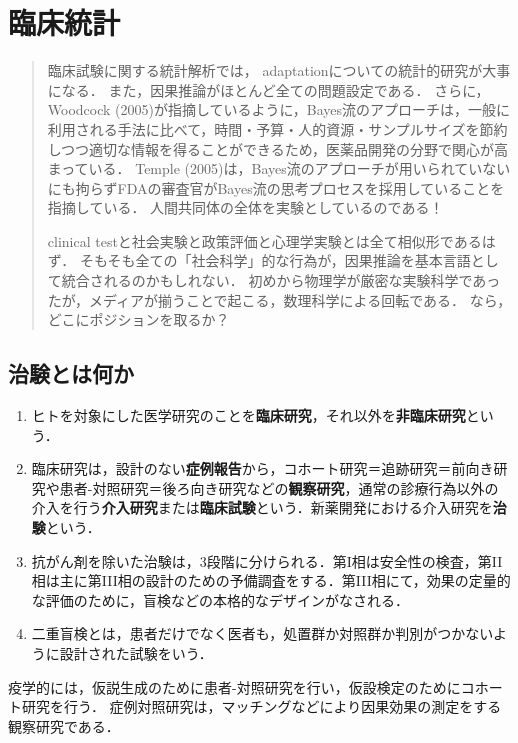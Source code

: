 \documentclass[uplatex,dvipdfmx]{jsreport}
\begin{document}
\chapter{臨床統計}

\begin{quotation}
    臨床試験に関する統計解析では，
    adaptationについての統計的研究が大事になる．
    また，因果推論がほとんど全ての問題設定である．
    さらに，Woodcock (2005)が指摘しているように，Bayes流のアプローチは，一般に利用される手法に比べて，時間・予算・人的資源・サンプルサイズを節約しつつ適切な情報を得ることができるため，医薬品開発の分野で関心が高まっている．
    Temple (2005)は，Bayes流のアプローチが用いられていないにも拘らずFDAの審査官がBayes流の思考プロセスを採用していることを指摘している．
    人間共同体の全体を実験としているのである！

    clinical testと社会実験と政策評価と心理学実験とは全て相似形であるはず．
    そもそも全ての「社会科学」的な行為が，因果推論を基本言語として統合されるのかもしれない．
    初めから物理学が厳密な実験科学であったが，メディアが揃うことで起こる，数理科学による回転である．
    なら，どこにポジションを取るか？
\end{quotation}

\section{治験とは何か}

\begin{definition}\mbox{}
    \begin{enumerate}
        \item ヒトを対象にした医学研究のことを\textbf{臨床研究}，それ以外を\textbf{非臨床研究}という．
        \item 臨床研究は，設計のない\textbf{症例報告}から，コホート研究＝追跡研究＝前向き研究や患者-対照研究＝後ろ向き研究などの\textbf{観察研究}，通常の診療行為以外の介入を行う\textbf{介入研究}または\textbf{臨床試験}という．新薬開発における介入研究を\textbf{治験}という．
        \item 抗がん剤を除いた治験は，3段階に分けられる．第I相は安全性の検査，第II相は主に第III相の設計のための予備調査をする．第III相にて，効果の定量的な評価のために，盲検などの本格的なデザインがなされる．
        \item 二重盲検とは，患者だけでなく医者も，処置群か対照群か判別がつかないように設計された試験をいう．
    \end{enumerate}
\end{definition}
\begin{remark}
    疫学的には，仮説生成のために患者-対照研究を行い，仮設検定のためにコホート研究を行う．
    症例対照研究は，マッチングなどにより因果効果の測定をする観察研究である．
\end{remark}
\end{document}
